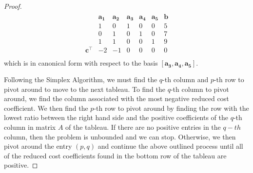\documentclass[12pt]{article}
\theoremstyle{definition}
\newcommand{\vect}[1]{\boldsymbol{#1}}
\begin{document}
\begin{proof}
\begin{align*}
    \begin{matrix}
      & \vect{a_1} & \vect{a_2} & \vect{a_3} & \vect{a_4} & \vect{a_5} & \vect{b} \\
      & 1 & 0 & 1 & 0 & 0 & 5 \\
      & 0 & 1 & 0 & 1 & 0 & 7 \\
      & 1 & 1 & 0 & 0 & 1 & 9 \\
      \vect{c}^\intercal & -2 & -1  & 0 & 0 & 0 & 0 \\
    \end{matrix}
  \end{align*}
  which is in canonical form with respect to the basis $[\vect{a_3}, \vect{a_4}, \vect{a_5}]$.

  Following the Simplex Algorithm, we must find the $q$-th column and $p$-th row to pivot around
  to move to the next tableau. To find the $q$-th column to pivot around, we find the column associated with
  the most negative reduced cost coefficient. We then find the $p$-th row to pivot
  around by finding the row with the lowest ratio between the right hand side and
  the positive coefficients of the $q$-th column in matrix $A$ of the tableau.
  If there are no positive entries in the $q-th$ column, then the problem is
  unbounded and we can stop. Otherwise, we then pivot
  around the entry $(p, q)$ and continue the above outlined process until all of the reduced
  cost coefficients found in the bottom row of the tableau are positive.


\end{proof}
\end{document}

